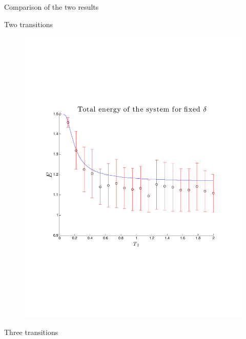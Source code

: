 \begin{frame}{Comparison of the two results}

     \vspace{1cm}
     
      	  	\begin{minipage}{0.49\textwidth}
      	  	\begin{block}{Two transitions }
      	  				\vspace{-1.7cm}
      	  	     	  	\begin{figure}
      	  	     	  	      	  \centering
      	  	     	  	      	  \includegraphics[width=\textwidth]{../src/plot/discreteSystems/AllInOneFixedTemp.pdf}
      	  	     	  	 \end{figure}
      	  	\end{block}
      	  	\end{minipage}
      	  	\begin{minipage}{0.49\textwidth}
      	  			\begin{block}{Three transitions}

\end{block}
\end{minipage}
\end{frame}
